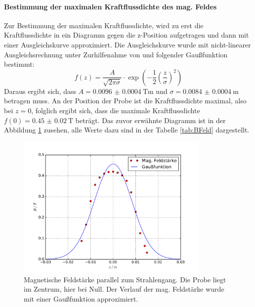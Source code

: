 \paragraph{Bestimmung der maximalen Kraftflussdichte des mag. Feldes}
Zur Bestimmung der maximalen Kraftflussdichte, wird zu erst die Kraftflussdichte in ein 
Diagramm gegen die z-Position aufgetragen und dann mit einer Ausgleichskurve approximiert. 
Die Ausgleichskurve wurde mit nicht-linearer Ausgleichsrechnung unter Zurhilfenahme von 
\cite{scipy} und folgender Gaußfunktion bestimmt: 
\begin{equation}
	f(z)= \frac{A}{\sqrt{2\pi\sigma}}\cdot\exp\left(-\frac{1}{2} \left(\frac{z}{\sigma} \right) ^2 \right)
\end{equation} 
Daraus ergibt sich, dass $A= \SI{0.0096(4)}{\tesla\meter}$ und $\sigma = \SI{0.0084(4)}{\meter}$ 
betragen muss. An der Position der Probe ist die Kraftflussdichte maximal, also bei 
$z =0$, folglich ergibt sich, dass  die maximale Kraftflussdichte $f(0) = \SI{0.45(2)}{\tesla}$ 
beträgt. Das zuvor erwähnte Diagramm ist in der Abbildung \ref{fig:BFeld} zusehen, alle Werte 
dazu sind in der Tabelle \ref{tab:BFeld} dargestellt.
 \begin{figure}
   \centering
   \includegraphics[height= 7cm]{plots/BFeld.pdf}
   \caption{Magnetische Feldstärke parallel zum Strahlengang. Die Probe liegt im Zentrum, hier bei Null. Der Verlauf der mag. Feldstärke wurde mit einer Gaußfunktion approximiert.}
   \label{fig:BFeld}
 \end{figure}

